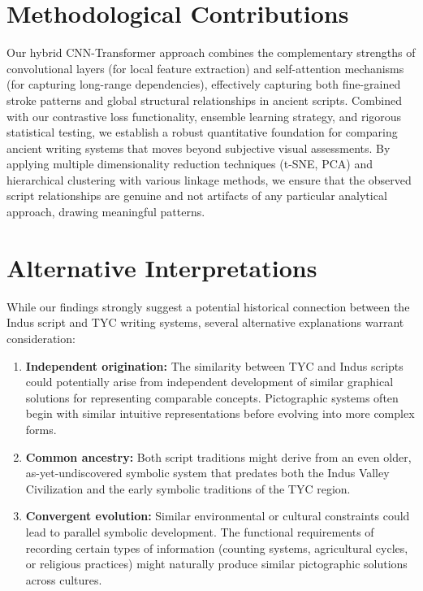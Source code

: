 \documentclass[11pt,a4paper,oneside]{report}
\begin{document}
\section{Methodological Contributions}
\noindent\hspace{1cm}
Our hybrid CNN-Transformer approach combines the complementary strengths of convolutional layers (for local feature extraction) and self-attention mechanisms (for capturing long-range dependencies), effectively capturing both fine-grained stroke patterns and global structural relationships in ancient scripts. Combined with our contrastive loss functionality, ensemble learning strategy, and rigorous statistical testing, we establish a robust quantitative foundation for comparing ancient writing systems that moves beyond subjective visual assessments. By applying multiple dimensionality reduction techniques (t-SNE, PCA) and hierarchical clustering with various linkage methods, we ensure that the observed script relationships are genuine and not artifacts of any particular analytical approach, drawing meaningful patterns.

\section{Alternative Interpretations}
\noindent\hspace{1cm}
While our findings strongly suggest a potential historical connection between the Indus script and TYC writing systems, several alternative explanations warrant consideration:

\begin{enumerate}
    \item \textbf{Independent origination:} The similarity between TYC and Indus scripts could potentially arise from independent development of similar graphical solutions for representing comparable concepts. Pictographic systems often begin with similar intuitive representations before evolving into more complex forms.
    \item \textbf{Common ancestry:} Both script traditions might derive from an even older, as-yet-undiscovered symbolic system that predates both the Indus Valley Civilization and the early symbolic traditions of the TYC region.
    \item \textbf{Convergent evolution:} Similar environmental or cultural constraints could lead to parallel symbolic development. The functional requirements of recording certain types of information (counting systems, agricultural cycles, or religious practices) might naturally produce similar pictographic solutions across cultures.

\end{enumerate}
\end{document}
